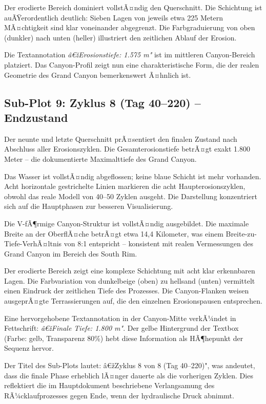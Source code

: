 ﻿\documentclass[12pt,a4paper]{report}
\begin{document}
Der erodierte Bereich dominiert vollstÃ¤ndig den Querschnitt. Die Schichtung ist auÃŸerordentlich deutlich: Sieben Lagen von jeweils etwa 225 Metern MÃ¤chtigkeit sind klar voneinander abgegrenzt. Die Farbgraduierung von oben (dunkler) nach unten (heller) illustriert den zeitlichen Ablauf der Erosion.

Die Textannotation \textit{â€žErosionstiefe: 1.575 m"} ist im mittleren Canyon-Bereich platziert. Das Canyon-Profil zeigt nun eine charakteristische Form, die der realen Geometrie des Grand Canyon bemerkenswert Ã¤hnlich ist.

\subsection{Sub-Plot 9: Zyklus 8 (Tag 40--220) -- Endzustand}

Der neunte und letzte Querschnitt prÃ¤sentiert den finalen Zustand nach Abschluss aller Erosionszyklen. Die Gesamterosionstiefe betrÃ¤gt exakt 1.800 Meter -- die dokumentierte Maximalttiefe des Grand Canyon.

Das Wasser ist vollstÃ¤ndig abgeflossen; keine blaue Schicht ist mehr vorhanden. Acht horizontale gestrichelte Linien markieren die acht Haupterosionszyklen, obwohl das reale Modell von 40--50 Zyklen ausgeht. Die Darstellung konzentriert sich auf die Hauptphasen zur besseren Visualisierung.

Die V-fÃ¶rmige Canyon-Struktur ist vollstÃ¤ndig ausgebildet. Die maximale Breite an der OberflÃ¤che betrÃ¤gt etwa 14,4 Kilometer, was einem Breite-zu-Tiefe-VerhÃ¤ltnis von 8:1 entspricht -- konsistent mit realen Vermessungen des Grand Canyon im Bereich des South Rim.

Der erodierte Bereich zeigt eine komplexe Schichtung mit acht klar erkennbaren Lagen. Die Farbvariation von dunkelbeige (oben) zu hellsand (unten) vermittelt einen Eindruck der zeitlichen Tiefe des Prozesses. Die Canyon-Flanken weisen ausgeprÃ¤gte Terrassierungen auf, die den einzelnen Erosionspausen entsprechen.

Eine hervorgehobene Textannotation in der Canyon-Mitte verkÃ¼ndet in Fettschrift: \textit{â€žFinale Tiefe: 1.800 m"}. Der gelbe Hintergrund der Textbox (Farbe: gelb, Transparenz 80\%) hebt diese Information als HÃ¶hepunkt der Sequenz hervor.

Der Titel des Sub-Plots lautet: â€žZyklus 8 von 8 (Tag 40--220)", was andeutet, dass die finale Phase erheblich lÃ¤nger dauerte als die vorherigen Zyklen. Dies reflektiert die im Hauptdokument beschriebene Verlangsamung des RÃ¼cklaufprozesses gegen Ende, wenn der hydraulische Druck abnimmt.
\end{document}
